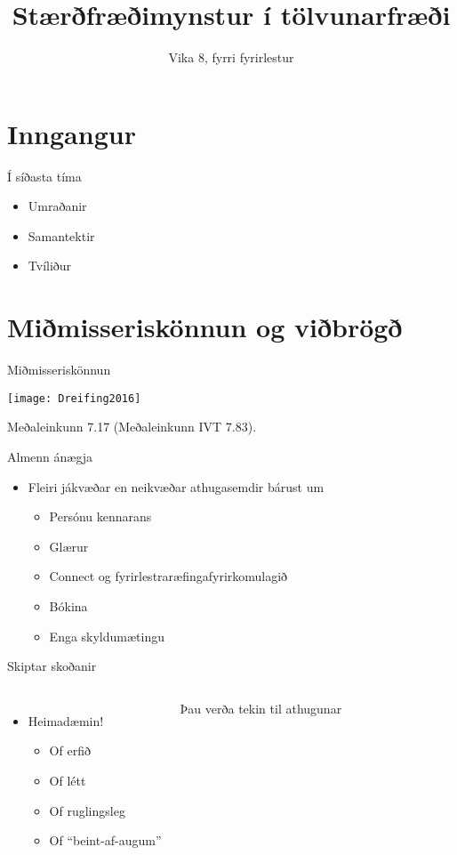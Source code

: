 \documentclass{beamer}
\title{Stærðfræðimynstur í tölvunarfræði}
\subtitle{Vika 8, fyrri fyrirlestur}
\begin{document}
\begin{frame}
\titlepage
\end{frame}


\section{Inngangur}

\begin{frame}{Í síðasta tíma}
\begin{itemize}
 \item Umraðanir
 \item Samantektir
 \item Tvíliður
\end{itemize}
\end{frame}

\section{Miðmisseriskönnun og viðbrögð}

\begin{frame}{Miðmisseriskönnun}
\begin{center}
\texttt{[image: Dreifing2016]}
\end{center}
Meðaleinkunn 7.17 (Meðaleinkunn IVT 7.83).
\end{frame}

\begin{frame}{Almenn ánægja}
\begin{itemize}
 \item Fleiri jákvæðar en neikvæðar athugasemdir bárust um
 \begin{itemize}[<+->]
  \item Persónu kennarans
  \item Glærur
  \item Connect og fyrirlestraræfingafyrirkomulagið
  \item Bókina
  \item Enga skyldumætingu
 \end{itemize}
\end{itemize}
\end{frame}

\begin{frame}{Skiptar skoðanir}
\begin{columns}
\begin{itemize}
 \item Heimadæmin!
 \begin{itemize}[<+->]
  \item Of erfið
  \item Of létt
  \item Of ruglingsleg
  \item Of ``beint-af-augum''
 \end{itemize}
\end{itemize}
Þau verða tekin til athugunar
\end{columns}
\end{frame}
\end{document}

